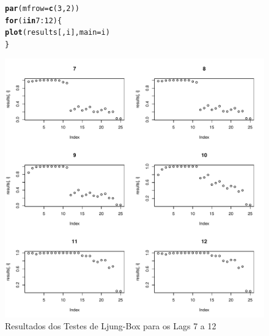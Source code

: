 \documentclass{article}\usepackage[]{graphicx}\usepackage[]{color}
\makeatletter
\def\maxwidth{ %
  \ifdim\Gin@nat@width>\linewidth
    \linewidth
  \else
    \Gin@nat@width
  \fi
}
\newcommand{\hlnum}[1]{\textcolor[rgb]{0.686,0.059,0.569}{#1}}%
\newcommand{\hlopt}[1]{\textcolor[rgb]{0,0,0}{#1}}%
\newcommand{\hlstd}[1]{\textcolor[rgb]{0.345,0.345,0.345}{#1}}%
\newcommand{\hlkwa}[1]{\textcolor[rgb]{0.161,0.373,0.58}{\textbf{#1}}}%
\newcommand{\hlkwc}[1]{\textcolor[rgb]{0.333,0.667,0.333}{#1}}%
\newcommand{\hlkwd}[1]{\textcolor[rgb]{0.737,0.353,0.396}{\textbf{#1}}}%
\newenvironment{kframe}{%
 \def\at@end@of@kframe{}%
 \ifinner\ifhmode%
  \def\at@end@of@kframe{\end{minipage}}%
  \begin{minipage}{\columnwidth}%
 \fi\fi%
 \def\FrameCommand##1{\hskip\@totalleftmargin \hskip-\fboxsep
 \colorbox{shadecolor}{##1}\hskip-\fboxsep
     \hskip-\linewidth \hskip-\@totalleftmargin \hskip\columnwidth}%
 \MakeFramed {\advance\hsize-\width
   \@totalleftmargin\z@ \linewidth\hsize
   \@setminipage}}%
 {\par\unskip\endMakeFramed%
 \at@end@of@kframe}
\newenvironment{knitrout}{}{} %
\makeatother
\begin{document}
            \begin{figure}[H]
            \caption{Resultados dos Testes de Ljung-Box para os Lags 7 a 12}
            \centering
\begin{knitrout}
\color{fgcolor}\begin{kframe}
\begin{alltt}
\hlkwd{par}\hlstd{(}\hlkwc{mfrow} \hlstd{=} \hlkwd{c}\hlstd{(}\hlnum{3}\hlstd{,}\hlnum{2}\hlstd{))}
\hlkwa{for} \hlstd{(i} \hlkwa{in} \hlnum{7}\hlopt{:}\hlnum{12}\hlstd{)\{}
  \hlkwd{plot}\hlstd{(results[,i],} \hlkwc{main}\hlstd{=i)}
\hlstd{\}}
\end{alltt}
\end{kframe}
\includegraphics[width=\maxwidth]{figure/unnamed-chunk-94-1} 

\end{knitrout}
            \end{figure}
            
\end{document}

